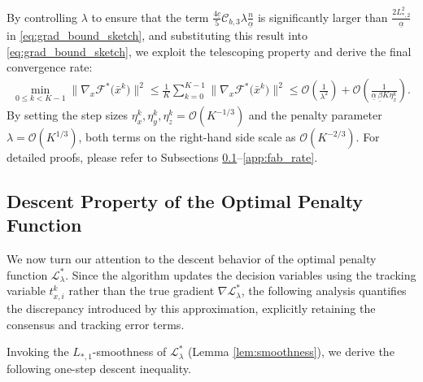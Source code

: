 \documentclass{article}
\theoremstyle{plain}
\theoremstyle{definition}
\theoremstyle{remark}
\begin{document}
By controlling $\lambda$ to ensure that the term $\frac{4\underline{c}}{5}\mathcal{C}_{b,3}\lambda \frac{n}{\underline{\alpha}}$ is significantly larger than $\frac{2 L_{*,2}^{2}}{\underline{\alpha}}$ in \eqref{eq:grad_bound_sketch}, and substituting this result into \eqref{eq:grad_bound_sketch}, we exploit the telescoping property and derive the final convergence rate: 
 \begin{align*}
        \min_{0 \le k < K-1} \big\|\nabla_{x} \mathcal{F}^{*}\big({\bar{x}}^k\big) \big\|^{2} \leq  \frac{1}{K}\sum_{k=0}^{K-1}\big\|\nabla_{x} \mathcal{F}^{*}\big({\bar{x}}^k\big) \big\|^{2}
        \leq \mathcal{O}\left(\frac{1}{\lambda^{2}}\right) + \mathcal{O}\left(\frac{1}{\underline{\alpha}\,\underline{\beta} K \eta_{x}^{k}}\right).
    \end{align*}
By setting the step sizes $\eta_{x}^{k}, \eta_{y}^{k},\eta_{z}^{k}=\mathcal{O}\left(K^{-1/3}\right)$ and the penalty parameter $\lambda=\mathcal{O}\left(K^{1/3}\right)$, both terms on the right-hand side scale as $\mathcal{O}(K^{-2/3})$. 
For detailed proofs, please refer to Subsections \ref{app:fab_descent}–\ref{app:fab_rate}.


\subsection{Descent Property of the Optimal Penalty Function} 
\label{app:fab_descent}

We now turn our attention to the descent behavior of the optimal penalty function $\mathcal{L}_{\lambda}^{*}$. Since the algorithm updates the decision variables using the tracking variable $t_{x,i}^k$ rather than the true gradient $\nabla \mathcal{L}_{\lambda}^{*}$, the following analysis quantifies the discrepancy introduced by this approximation, explicitly retaining the consensus and tracking error terms.

Invoking the $L_{*,1}$-smoothness of $\mathcal{L}_{\lambda}^{*}$ (Lemma \ref{lem:smoothness}), we derive the following one-step descent inequality.
\end{document}
